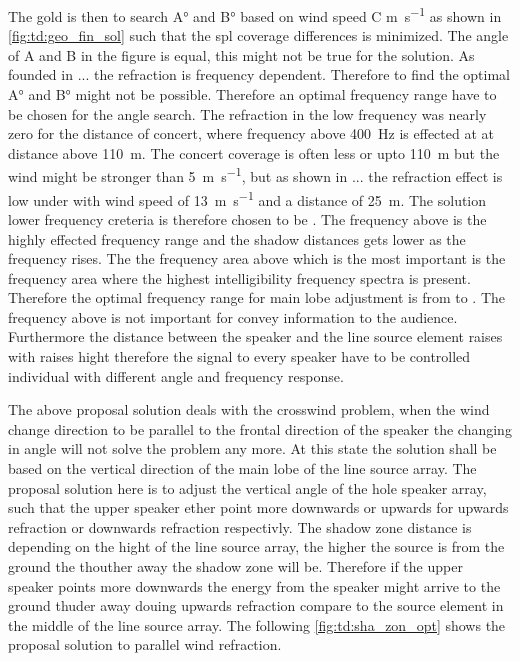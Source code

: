 The gold is then to search A\si{\degree} and B\si{\degree} based on wind speed C \si{\meter\per\second} as shown in \autoref{fig:td:geo_fin_sol} such that the \gls{spl} coverage differences is minimized. The angle of A and B in the figure is equal, this might not be true for the solution. As founded in ... the refraction is frequency dependent. Therefore to find the optimal  A\si{\degree} and B\si{\degree} might not be possible. Therefore an optimal frequency range have to be chosen for the angle search. The refraction in the low frequency was nearly zero for the distance of concert, where frequency above \SI{400}{\hertz} is effected at at distance above \SI{110}{\meter}. The concert coverage is often less or upto \SI{110}{\meter} but the wind might be stronger than \SI{5}{\meter\per\second}, but as shown in ... the refraction effect is low under  with wind speed of \SI{13}{\meter\per\second} and a distance of \SI{25}{\meter}. The solution lower frequency creteria is therefore chosen to be . The frequency above  is the highly effected frequency range and the shadow distances gets lower as the frequency rises. The the frequency area above  which is the most important is the frequency area where the highest intelligibility frequency spectra is present. Therefore the optimal frequency range for main lobe adjustment is from  to . The frequency above is not important for convey information to the audience. Furthermore the distance between the speaker and the line source element raises with raises hight therefore the signal to every speaker have to be controlled individual with different angle and frequency response. 

The above proposal solution deals with the crosswind problem, when the wind change direction to be parallel to the frontal direction of the speaker the changing in angle will not solve the problem any more. At this state the solution shall be based on the vertical direction of the main lobe of the line source array. The proposal solution here is to adjust the vertical angle of the hole speaker array, such that the upper speaker ether point more downwards or upwards for upwards refraction or downwards refraction respectivly. The shadow zone distance is depending on the hight of the line source array, the higher the source is from the ground the thouther away the shadow zone will be. Therefore if the upper speaker points more downwards the energy from the speaker might arrive to the ground thuder away douing upwards refraction compare to the source element in the middle of the line source array. The following \autoref{fig:td:sha_zon_opt} shows the proposal solution to parallel wind refraction.  

